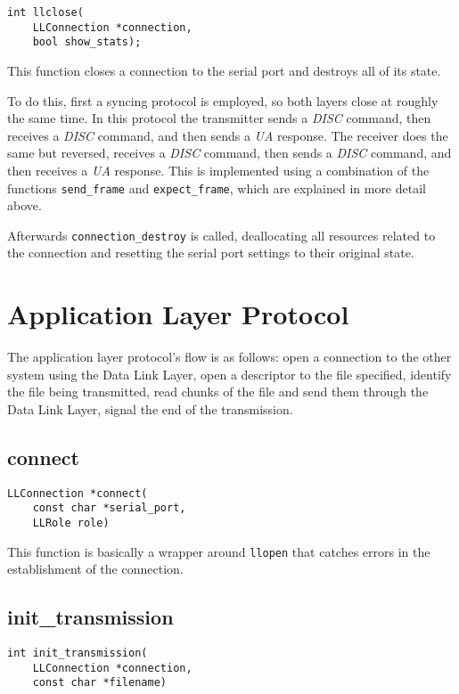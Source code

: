 \documentclass[11pt,a4paper,twocolumn]{article}
\begin{document}
\begin{lstlisting}
int llclose(
    LLConnection *connection, 
    bool show_stats);
\end{lstlisting}

This function closes a connection to the serial port and destroys all of its state.

To do this, first a syncing protocol is employed, so both layers close at roughly the same time.
In this protocol the transmitter sends a \textit{DISC} command, then receives a \textit{DISC} command, and then sends a \textit{UA} response.
The receiver does the same but reversed, receives a \textit{DISC} command, then sends a \textit{DISC} command, and then receives a \textit{UA} response.
This is implemented using a combination of the functions \lstinline{send_frame} and \lstinline{expect_frame}, which are explained in more detail above.

Afterwards \lstinline{connection_destroy} is called, deallocating all resources related to the connection and resetting the serial port settings to their original state.

\section{Application Layer Protocol}

The application layer protocol's flow is as follows: open a connection to the other system using the Data Link Layer, open a descriptor to the file specified, identify the file being transmitted, read chunks of the file and send them through the Data Link Layer, signal the end of the transmission.

\subsection{connect}

\begin{lstlisting}
LLConnection *connect(
    const char *serial_port,
    LLRole role)
\end{lstlisting}

This function is basically a wrapper around \lstinline{llopen} that catches errors in the establishment of the connection.

\subsection{init\_transmission}

\begin{lstlisting}
int init_transmission(
    LLConnection *connection,
    const char *filename)
\end{lstlisting}
\end{document}

